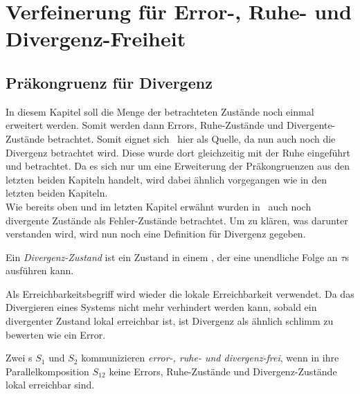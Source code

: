 \chapter{Verfeinerung für Error-, Ruhe- und Divergenz-Freiheit}

\section{Präkongruenz für Divergenz}

In diesem Kapitel soll die Menge der betrachteten Zustände noch einmal
erweitert werden. Somit werden dann Errors, Ruhe-Zustände und
Divergente-Zustände betrachtet. Somit eignet sich~\cite{Chilton2013} hier als
Quelle, da nun auch noch die Divergenz betrachtet wird. Diese wurde dort
gleichzeitig mit der Ruhe eingeführt und betrachtet. Da es sich nur um eine
Erweiterung der Präkongruenzen aus den letzten beiden Kapiteln handelt, wird
dabei ähnlich vorgegangen wie in den letzten beiden Kapiteln.\\
Wie bereits oben und im letzten Kapitel erwähnt wurden in~\cite{Chilton2013}
auch noch divergente Zustände als Fehler-Zustände betrachtet. Um zu klären, was
darunter verstanden wird, wird nun noch eine Definition für Divergenz gegeben.

\begin{Def}[Divergenz]
  Ein \emph{Divergenz-Zustand} ist ein Zustand in einem \EIO{}, der eine
  unendliche Folge an $\tau$s ausführen kann.%
\end{Def}

Als Erreichbarkeitsbegriff wird wieder die lokale Erreichbarkeit verwendet.
Da das Divergieren eines Systems nicht mehr verhindert werden kann, sobald ein
divergenter Zustand lokal erreichbar ist, ist Divergenz als ähnlich
\glqq{}schlimm\grqq{} zu bewerten wie ein Error.

\begin{Def}
  Zwei \EIO{}s $S_1$ und $S_2$ kommunizieren \emph{error-, ruhe- und
  divergenz-frei}, wenn in ihre Parallelkomposition $S_{12}$ keine Errors,
  Ruhe-Zustände und Divergenz-Zustände lokal erreichbar sind.
\end{Def}

